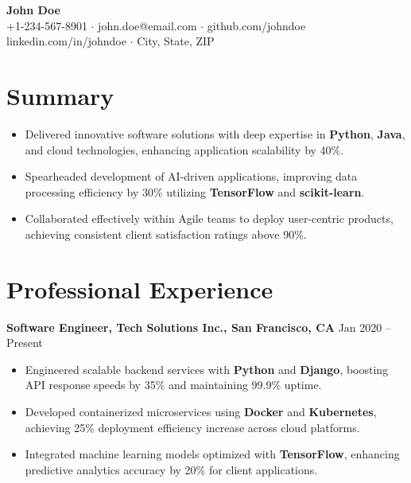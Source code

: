 \documentclass[a4paper,10pt]{article}
\begin{document}
\begin{center}
    {\LARGE \bf John Doe} \\[6pt]
    \small
    +1-234-567-8901 $\cdot$ john.doe@email.com $\cdot$ github.com/johndoe \\
    linkedin.com/in/johndoe $\cdot$ City, State, ZIP \\
\end{center}

\vspace{0.15in}

\section*{Summary}
\begin{itemize}
    \item Delivered innovative software solutions with deep expertise in \textbf{Python}, \textbf{Java}, and cloud technologies, enhancing application scalability by 40\%.
    \item Spearheaded development of AI-driven applications, improving data processing efficiency by 30\% utilizing \textbf{TensorFlow} and \textbf{scikit-learn}.
    \item Collaborated effectively within Agile teams to deploy user-centric products, achieving consistent client satisfaction ratings above 90\%.
\end{itemize}

\vspace{0.1in}

\section*{Professional Experience}

\textbf{Software Engineer, Tech Solutions Inc., San Francisco, CA} \hfill Jan 2020 -- Present
\begin{itemize}
    \item Engineered scalable backend services with \textbf{Python} and \textbf{Django}, boosting API response speeds by 35\% and maintaining 99.9\% uptime.
    \item Developed containerized microservices using \textbf{Docker} and \textbf{Kubernetes}, achieving 25\% deployment efficiency increase across cloud platforms.
    \item Integrated machine learning models optimized with \textbf{TensorFlow}, enhancing predictive analytics accuracy by 20\% for client applications.
\end{itemize}
\end{document}
